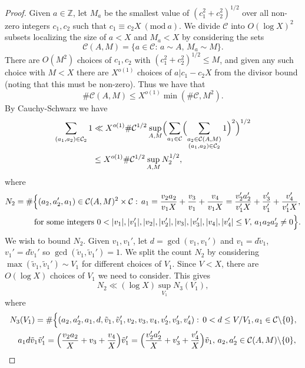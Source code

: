 \documentclass[10pt]{amsart}
\theoremstyle{plain}
\numberwithin{sblmm}{thrm}
\numberwithin{equation}{section}
\newcommand{\Mod}[1]{\ (\mathrm{mod}\ #1)}
\begin{document}
\begin{proof}
Given $a\in\mathbb{Z}$, let $M_a$ be the smallest value of $(c_1^2+c_2^2)^{1/2}$ over all non-zero integers $c_1,c_2$ such that $c_1\equiv c_2 X\Mod{a}$. We divide $\mathcal{C}$ into $O(\log{X})^2$ subsets localizing the size of $a<X$ and $M_a<X$ by considering the sets
\[
\mathcal{C}(A,M)=\{a\in\mathcal{C}:\,a\sim A,\, M_a\sim M\}.
\]
There are $O(M^2)$ choices of $c_1,c_2$ with $(c_1^2+c_2^2)^{1/2}\le M$, and given any such choice with $M<X$ there are $X^{o(1)}$ choices of $a|c_1-c_2 X$ from the divisor bound (noting that this must be non-zero). Thus we have that 
\[
\#\mathcal{C}(A,M)\le X^{o(1)}\min(\#\mathcal{C},M^2).
\]
By Cauchy-Schwarz we have
%
\begin{align}
\sum_{(a_1,a_2)\in\mathcal{C}_2}1
&\ll X^{o(1)} \#\mathcal{C}^{1/2}\sup_{A,M}\Bigl(\sum_{a_1\in\mathcal{C}}\Bigl(\sum_{\substack{a_2\in\mathcal{C}(A,M) \\ (a_1,a_2)\in\mathcal{C}_2}}1\Bigr)^2\Bigr)^{1/2}\nonumber\\
&\le X^{o(1)}\#\mathcal{C}^{1/2} \sup_{A,M}N_2^{1/2},\label{eq:CauchyCountBound}
\end{align}
%
where
%
\begin{align*}
N_2&=\#\Bigl\{(a_2,a_2',a_1)\in\mathcal{C}(A,M)^2\times\mathcal{C}:\,a_1=\frac{v_2a_2}{v_1X}+\frac{v_3}{v_1}+\frac{v_4}{v_1X}=\frac{v_2'a_2'}{v_1'X}+\frac{v_3'}{v_1'}+\frac{v_4'}{v_1'X},\\
&\qquad \text{ for some integers } 0<|v_1|,|v_1'|,|v_2|,|v_2'|,|v_3|,|v_3'|,|v_4|,|v_4'|\le V,\,a_1a_2a_2'\ne 0\Bigr\}.
\end{align*}
We wish to bound $N_2$. Given $v_1,v_1'$, let $d=\gcd(v_1,v_1')$ and $v_1=d\tilde{v}_1$, $v_1'=d\tilde{v}_1'$ so $\gcd(\tilde{v}_1,\tilde{v}_1')=1$. We split the count $N_2$ by considering $\max(\tilde{v}_1,\tilde{v}_1')\sim V_1$ for different choices of $V_1$. Since $V< X$, there are $O(\log{X})$ choices of $V_1$ we need to consider. This gives
\begin{equation}
N_2\ll (\log{X})\sup_{V_1}N_3(V_1),
\label{eq:N2Bound}
\end{equation}
where
\begin{align*}
&N_3(V_1)=\#\Bigl\{(a_2,a_2',a_1,d,\tilde{v}_1,\tilde{v}_1',v_2,v_3,v_4,v_2',v_3',v_4'):\,0<d\le V/V_1, a_1\in\mathcal{C}\backslash\{0\},\\
&\quad a_1d\tilde{v}_1\tilde{v}_1'=\Bigl(\frac{v_2a_2}{X}+v_3+\frac{v_4}{X}\Bigr)\tilde{v}_1'=\Bigl(\frac{v_2'a_2'}{X}+v_3'+\frac{v_4'}{X}\Bigr)\tilde{v}_1,\,a_2,a_2'\in\mathcal{C}(A,M)\backslash\{0\},\\

\end{align*}
\end{proof}
\end{document}
